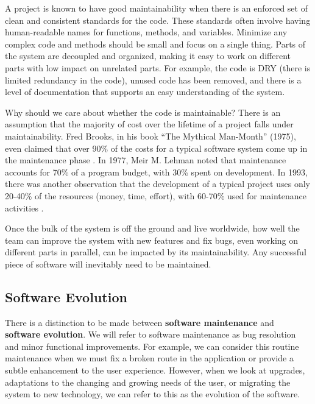 A project is known to have good maintainability when there is an enforced set of clean and consistent standards for the code. These standards often involve having human-readable names for functions, methods, and variables. Minimize any complex code and methods should be small and focus on a single thing. Parts of the system are decoupled and organized, making it easy to work on different parts with low impact on unrelated parts. For example, the code is DRY (there is limited redundancy in the code), unused code has been removed, and there is a level of documentation that supports an easy understanding of the system.

Why should we care about whether the code is maintainable? There is an assumption that the majority of cost over the lifetime of a project falls under maintainability. Fred Brooks, in his book ``The Mythical Man-Month'' (1975), even claimed that over 90\% of the costs for a typical software system come up in the maintenance phase \cite{brooks:mythical}. In 1977, Meir M. Lehman noted that maintenance accounts for 70\% of a program budget, with 30\% spent on development. In 1993, there was another observation that the development of a typical project uses only 20-40\% of the resources (money, time, effort), with 60-70\% used for maintenance activities \cite{ieee:1219}.

Once the bulk of the system is off the ground and live worldwide, how well the team can improve the system with new features and fix bugs, even working on different parts in parallel, can be impacted by its maintainability. Any successful piece of software will inevitably need to be maintained.


\subsection{Software Evolution} \label{subSoftwareEvolution}

There is a distinction to be made between \textbf{software maintenance} and \textbf{software evolution}. We will refer to software maintenance as bug resolution and minor functional improvements. For example, we can consider this routine maintenance when we must fix a broken route in the application or provide a subtle enhancement to the user experience. However, when we look at upgrades, adaptations to the changing and growing needs of the user, or migrating the system to new technology, we can refer to this as the evolution of the software.

